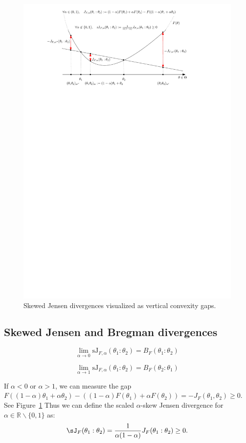 \documentclass[11pt]{article}
\def\bbR{\mathbb{R}}
\begin{document}
\begin{figure}%
\centering
\includegraphics[width=0.75\columnwidth]{FigIpe-skewJS.pdf} 

 
\caption{Skewed Jensen divergences visualized as vertical convexity gaps.}%
\label{fig:JendenDiv}
\end{figure}

\subsection{Skewed Jensen and Bregman divergences}

$$
\lim_{\alpha\rightarrow 0} \mathrm{sJ}_{F,\alpha}(\theta_1:\theta_2)=B_F(\theta_1:\theta_2)
$$

$$
\lim_{\alpha\rightarrow 1} \mathrm{sJ}_{F,\alpha}(\theta_1:\theta_2)=B_F(\theta_2:\theta_1)
$$



If $\alpha<0$ or $\alpha>1$, we can measure the gap $F((1-\alpha)\theta_1+\alpha\theta_2)-((1-\alpha) F(\theta_1)+\alpha F(\theta_2))=-J_F(\theta_1,\theta_2)\geq 0$.
See Figure~\ref{fig:JendenDiv}
Thus we can define the scaled $\alpha$-skew Jensen divergence for $\alpha\in\bbR\backslash\{0,1\}$ as:
$$
\sJ_F(\theta_1:\theta_2)=\frac{1}{\alpha(1-\alpha)}J_F(\theta_1:\theta_2)\geq 0.
$$
\end{document}
